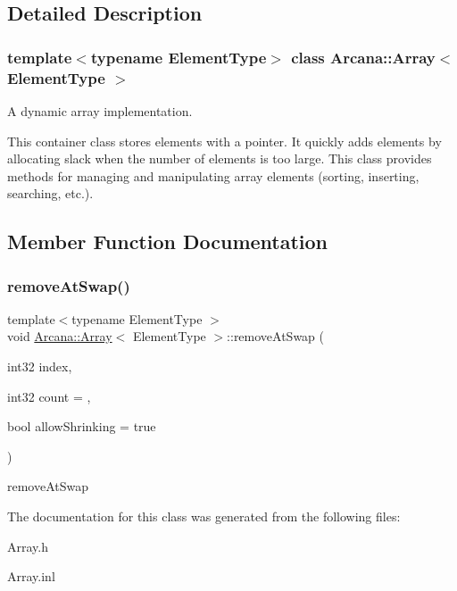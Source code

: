 \subsection{Detailed Description}
\subsubsection*{template$<$typename Element\+Type$>$\newline
class Arcana\+::\+Array$<$ Element\+Type $>$}

A dynamic array implementation. 

This container class stores elements with a pointer. It quickly adds elements by allocating slack when the number of elements is too large. This class provides methods for managing and manipulating array elements (sorting, inserting, searching, etc.). 

\subsection{Member Function Documentation}
\mbox{\label{class_arcana_1_1_array_ad6aca0bea9702efa10f13b589a82630a}} 
\subsubsection{\texorpdfstring{remove\+At\+Swap()}{removeAtSwap()}}
{\footnotesize\ttfamily template$<$typename Element\+Type $>$ \\
void \mbox{\hyperlink{class_arcana_1_1_array}{Arcana\+::\+Array}}$<$ Element\+Type $>$\+::remove\+At\+Swap (\begin{DoxyParamCaption}\item[{int32}]{index,  }\item[{int32}]{count = {},  }\item[{bool}]{allow\+Shrinking = {\ttfamily true} }\end{DoxyParamCaption})}



remove\+At\+Swap 



The documentation for this class was generated from the following files\+:\begin{DoxyCompactItemize}
\item 
Array.\+h\item 
Array.\+inl\end{DoxyCompactItemize}
